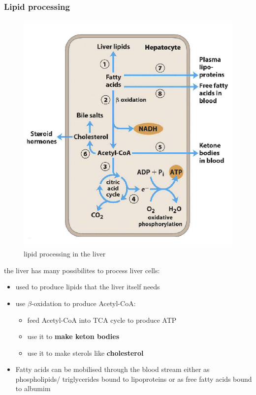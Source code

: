 \documentclass[../main.tex]{subfiles}
\begin{document}
\subsubsection{Lipid processing}
\begin{figure}[H]
    \centering
    \includegraphics[width=0.5\linewidth]{Sum_BC_II//lectures//bcll12/liverLipids.png}
    \caption{lipid processing in the liver}
    \label{fig:enter-label}
\end{figure}
the liver has many possibilites to process liver cells:
\begin{itemize}
    \item used to produce lipids that the liver itself needs
    \item use $\beta$-oxidation to produce Acetyl-CoA:
    \begin{itemize}
        \item feed Acetyl-CoA into TCA cycle to produce ATP
        \item use it to \textbf{make keton bodies}
        \item use it to make sterols like \textbf{cholesterol}
    \end{itemize}
    \item Fatty acids can be mobilised 
    through the blood stream either as 
    phospholipids/ triglycerides bound to 
    lipoproteins or as free fatty acids bound 
    to albumim
\end{itemize}
\end{document}
